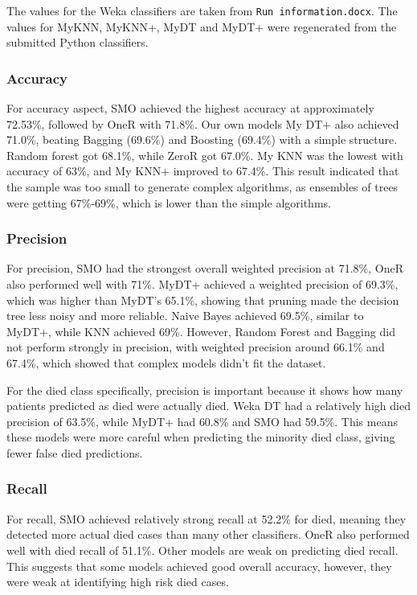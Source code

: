 \documentclass[12pt,a4paper]{article}
\begin{document}
The values for the Weka classifiers are taken from \texttt{Run information.docx}. The values for MyKNN, MyKNN+, MyDT and MyDT+ were regenerated from the submitted Python classifiers.


\subsubsection{Accuracy}

For accuracy aspect, SMO achieved the highest accuracy at approximately 72.53\%, followed by OneR with 71.8\%. Our own models My DT+ also achieved 71.0\%, beating Bagging (69.6\%) and Boosting (69.4\%) with a simple structure. Random forest got 68.1\%, while ZeroR got 67.0\%. My KNN was the lowest with accuracy of 63\%, and My KNN+ improved to 67.4\%. This result indicated that the sample was too small to generate complex algorithms, as ensembles of trees were getting 67\%-69\%, which is lower than the simple algorithms.

\subsubsection{Precision}

For precision, SMO had the strongest overall weighted precision at 71.8\%, OneR also performed well with 71\%. MyDT+ achieved a weighted precision of 69.3\%, which was higher than MyDT's 65.1\%, showing that pruning made the decision tree less noisy and more reliable. Naive Bayes achieved 69.5\%, similar to MyDT+, while KNN achieved 69\%. However, Random Forest and Bagging did not perform strongly in precision, with weighted precision around 66.1\% and 67.4\%, which showed that complex models didn't fit the dataset.

For the died class specifically, precision is important because it shows how many patients predicted as died were actually died. Weka DT had a relatively high died precision of 63.5\%, while MyDT+ had 60.8\% and SMO had 59.5\%. This means these models were more careful when predicting the minority died class, giving fewer false died predictions.

\subsubsection{Recall}

For recall, SMO achieved relatively strong recall at 52.2\% for died, meaning they detected more actual died cases than many other classifiers. OneR also performed well with died recall of 51.1\%. Other models are weak on predicting died recall. This suggests that some models achieved good overall accuracy, however, they were weak at identifying high risk died cases.
\end{document}
